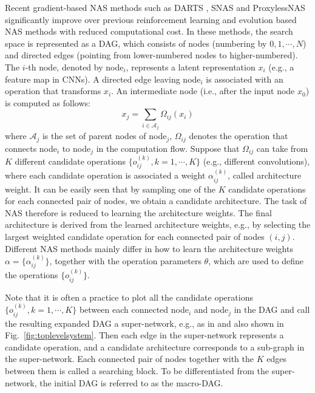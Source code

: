 \documentclass{article}
\newcommand{\figref}{Fig.~\ref}
\begin{document}
Recent gradient-based NAS methods such as DARTS \cite{liu2018darts}, SNAS \cite{xie2018snas} and ProxylessNAS \cite{cai2018proxelessnas} significantly improve over previous reinforcement learning and evolution based NAS methods with reduced computational cost.
In these methods, the search space is represented as a DAG, which consists of nodes (numbering by $0,1,\cdots,N$) and directed edges (pointing from lower-numbered nodes to higher-numbered). The $i$-th node, denoted by node$_i$, represents a latent representation $x_i$ (e.g., a feature map in CNNs). A directed edge leaving node$_i$ is associated with an operation that transforms $x_i$. An intermediate node (i.e., after the input node $x_0$) is computed as follows:
\begin{equation}
    x_j = \sum_{i \in \mathcal{A}_j}{\Omega_{ij}(x_i)}
    \label{eq:x_j}
\end{equation}
where $\mathcal{A}_j$ is the set of parent nodes of node$_j$, $\Omega_{ij}$ denotes the operation that connects node$_i$ to node$_j$ in the computation flow.
Suppose that $\Omega_{ij}$ can take from $K$ different candidate operations $\{o_{ij}^{(k)},k=1,\cdots,K\}$ (e.g., different convolutions), where each candidate operation is associated a weight $\alpha_{ij}^{(k)}$, called architecture weight.
It can be easily seen that by sampling one of the $K$ candidate operations for each connected pair of nodes, we obtain a candidate architecture.
The task of NAS therefore is reduced to learning the architecture weights. The final architecture is derived from the learned architecture weights, e.g., by selecting the largest weighted candidate operation for each connected pair of nodes $(i,j)$.
Different NAS methods mainly differ in how to learn the architecture weights $\alpha = \{\alpha_{ij}^{(k)}\}$, together with the operation parameters $\theta$, which are used to define the operations $\{o_{ij}^{(k)}\}$.

Note that it is often a practice to plot all the candidate operations $\{o_{ij}^{(k)},k=1,\cdots,K\}$ between each connected node$_i$ and node$_j$ in the DAG and call the resulting expanded DAG a super-network, e.g., as in \cite{liu2018darts,xie2018snas,cai2018proxelessnas} and also shown in \figref{fig:toplevelsystem}.
Then each edge in the super-network represents a candidate operation, and a candidate architecture corresponds to a sub-graph in the super-network.
Each connected pair of nodes together with the $K$ edges between them is called a searching block.
To be differentiated from the super-network, the initial DAG is referred to as the macro-DAG.
\end{document}
